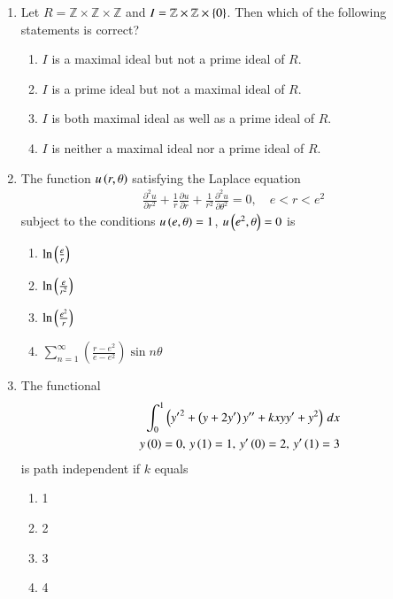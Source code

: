 \documentclass[journal]{IEEEtran}
\begin{document}
\begin{enumerate} 

	\item Let $R = \mathbb{Z} \times \mathbb{Z} \times \mathbb{Z}$ and $I = \mathbb{Z} \times \mathbb{Z} \times \left\{0\right\}$.  
Then which of the following statements is correct?

\begin{enumerate}
    \item $I$ is a maximal ideal but not a prime ideal of $R$.
    \item $I$ is a prime ideal but not a maximal ideal of $R$.
    \item $I$ is both maximal ideal as well as a prime ideal of $R$.
    \item $I$ is neither a maximal ideal nor a prime ideal of $R$.
\end{enumerate}

\item The function $u \left(r, \theta\right)$ satisfying the Laplace equation
\begin{align*}
\frac{\partial^2 u}{\partial r^2} + \frac{1}{r} \frac{\partial u}{\partial r} + \frac{1}{r^2} \frac{\partial^2 u}{\partial \theta^2} = 0, \quad e < r < e^2
\end{align*}
subject to the conditions $u \left(e, \theta\right) = 1$, $u \left(e^2, \theta\right) = 0$ is

\begin{enumerate}
    \item $\ln \left(\frac{e}{r}\right)$
    \item $\ln \left(\frac{e}{r^2}\right)$
    \item $\ln \left(\frac{e^2}{r}\right)$
    \item $\sum_{n=1}^{\infty} \left( \frac{r - e^2}{e - e^2} \right) \sin n\theta$
\end{enumerate}

\item The functional
\begin{align*}
	\int_{0}^{1} \left( {y^{\prime}}^2 + \left(y + 2y^{\prime}\right) y^{\prime \prime} + kxyy^{\prime} + y^2 \right) \, dx 
	\\ \quad y \left(0\right) = 0, \, y \left(1\right) = 1, \, y^\prime \left(0\right) = 2, \, y^\prime \left(1\right) = 3
\end{align*}
is path independent if $k$ equals

\begin{enumerate}
    \item 1
    \item 2
    \item 3
    \item 4
\end{enumerate}


\end{enumerate}
\end{document}

